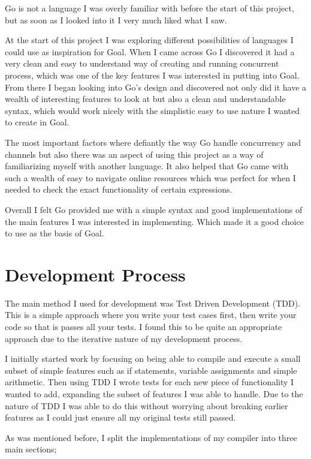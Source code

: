 Go is not a language I was overly familiar with before the start of this project, but as soon as I looked into it I very much liked what I saw. 

At the start of this project I was exploring different possibilities of languages I could use as inspiration for Goal. When I came across Go I discovered it had a very clean and easy to understand way of creating and running concurrent process, which was one of the key features I was interested in putting into Goal. From there I began looking into Go's design and discovered not only did it have a wealth of interesting features to look at but also a clean and understandable syntax, which would work nicely with the simplistic easy to use nature I wanted to create in Goal.

The most important factors where defiantly the way Go handle concurrency and channels but also there was an aspect of using this project as a way of familiarizing myself with another language. It also helped that Go came with such a wealth of easy to navigate online resources which was perfect for when I needed to check the exact functionality of certain expressions.

Overall I felt Go provided me with a simple syntax and good implementations of the main features I was interested in implementing. Which made it a good choice to use as the basis of Goal.

\section{Development Process }

The main method I used for development was Test Driven Development (TDD). This is a simple approach where you write your test cases first, then write your code so that is passes all your tests. I found this to be quite an appropriate approach due to the iterative nature of my development process. 

I initially started work by focusing on being able to compile and execute a small subset of simple features such as if statements, variable assignments and simple arithmetic. Then using TDD I wrote tests for each new piece of functionality I wanted to add, expanding the subset of features I was able to handle. Due to the nature of TDD I was able to do this without worrying about breaking earlier features as I could just ensure all my original tests still passed.

As was mentioned before, I split the implementations of my compiler into three main sections;

